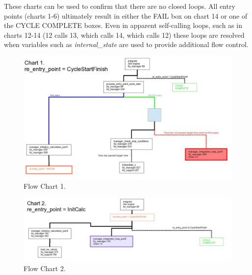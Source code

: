 These charts can be used to confirm that there are no closed loops.  All entry
points (charts 1-6) ultimately result in either the FAIL box on chart 14 or
one of the CYCLE COMPLETE boxes.
Even in apparent self-calling loops, such as in charts 12-14
(12 calls 13, which calls
14, which calls 12) these loops are resolved when variables such as
\textit{internal\_state} are used to provide additional flow control.

\begin{figure}[htp]
\begin{center}
\includegraphics[width=6.5in]{figures/lsode_flow1.jpg}
\caption{Flow Chart 1.}
\end{center}
\end{figure}

\begin{figure}[htp]
\begin{center}
\includegraphics[width=6.5in]{figures/lsode_flow2.jpg}
\caption{Flow Chart 2.}
\end{center}
\end{figure}

